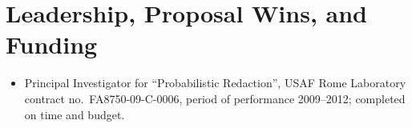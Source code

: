 \vspace{1mm}
\section*{Leadership, Proposal Wins, and Funding}

\vspace{-3mm}
\begin{itemize}
    \item Principal Investigator for ``Probabilistic Redaction'', USAF Rome
        Laboratory contract no.\ FA8750-09-C-0006, period of performance
        2009--2012; completed on time and budget.
\end{itemize}
\vspace{-1mm}
